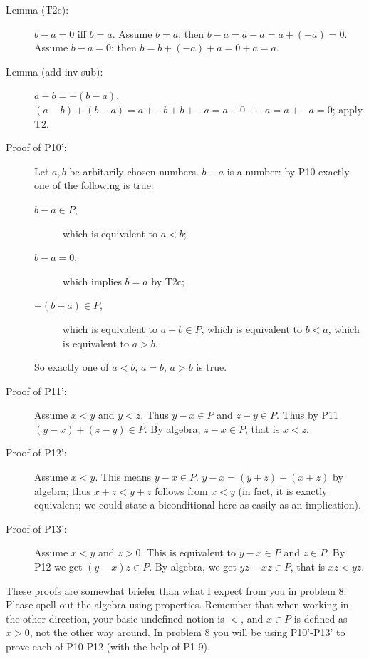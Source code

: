 \documentclass[12pt]{article}
\begin{document}
\begin{description}

\item[Lemma (T2c):]  $b-a=0$ iff $b=a$.  Assume $b=a$; then $b-a=a-a=a+(-a)=0$.  Assume $b-a=0$:  then $b=b+(-a)+a=0+a=a$.

\item[Lemma (add inv sub):]  $a-b = -(b-a)$.  $(a-b) + (b-a) = a+ -b + b + -a = a+0+-a = a+ -a = 0$; apply T2.

\newpage

\item[Proof of P10':]   Let $a,b$ be arbitarily chosen numbers.  $b-a$ is a number:  by P10 exactly one of the following is true:

\begin{description}

\item[$b-a \in P$,] which is equivalent to $a<b$; \item[$b-a=0$,] which implies $b=a$ by T2c; \item[$-(b-a) \in P$,] which is equivalent to $a-b \in P$, which is equivalent to $b<a$, which is equivalent to $a>b$.

\end{description}

So exactly one of $a<b$, $a=b$, $a>b$ is true.

\item[Proof of P11':]  Assume $x<y$ and $y<z$.  Thus $y-x \in P$ and $z-y \in P$.  Thus by P11 $(y-x)+(z-y) \in P$.
By algebra, $z-x \in P$, that is $x<z$.

\item[Proof of P12':]  Assume $x<y$.  This means $y-x \in P$.  $y-x=(y+z)-(x+z)$ by algebra;  thus $x+z < y+z$ follows from $x<y$ (in fact, it is exactly equivalent; we could state a biconditional here as easily as an implication).

\item[Proof of P13':]  Assume $x<y$ and $z>0$.  This is equivalent to $y-x \in P$ and $z \in P$.  By P12 we get
$(y-x)z \in P$.  By algebra, we get $yz-xz \in P$, that is $xz<yz$.

\end{description}

These proofs are somewhat briefer than what I expect from you in problem 8.  Please spell out the algebra using properties.
Remember that when working in the other direction, your basic undefined notion is $<$, and $x \in P$ is defined
as $x>0$, not the other way around.  In problem 8 you will be using P10'-P13' to prove each of P10-P12 (with the help of
P1-9).
\end{document}
